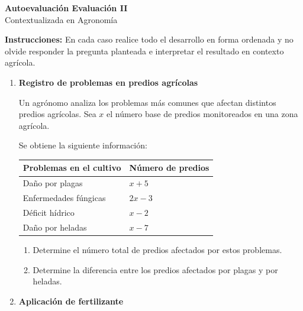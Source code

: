 \documentclass[12pt]{article}
\begin{document}
	
	\begin{center}
		{\LARGE \textbf{Autoevaluación Evaluación II}}\\[0.2cm]
		{\large Contextualizada en Agronomía}
	\end{center}
	
	\vspace{0.4cm}
	
	\textbf{Instrucciones:} En cada caso realice todo el desarrollo en forma ordenada y no olvide responder la pregunta planteada e interpretar el resultado en contexto agrícola.
	
	\vspace{0.5cm}
	
	\begin{enumerate}
		
		\item \textbf{Registro de problemas en predios agrícolas}
		
		Un agrónomo analiza los problemas más comunes que afectan distintos predios agrícolas.  
		Sea \(x\) el número base de predios monitoreados en una zona agrícola.
		
		Se obtiene la siguiente información:
		
		\begin{center}
			\begin{tabular}{|m{8cm}|>{\centering\arraybackslash}m{4cm}|}
				\hline
				\textbf{Problemas en el cultivo} & \textbf{Número de predios} \\
				\hline
				Daño por plagas & \(x + 5\) \\ \hline
				Enfermedades fúngicas & \(2x - 3\) \\ \hline
				Déficit hídrico & \(x - 2\) \\ \hline
				Daño por heladas & \(x - 7\) \\ \hline
			\end{tabular}
		\end{center}
		
		\begin{enumerate}[label=\alph*)]
			\item Determine el número total de predios afectados por estos problemas.
			\item Determine la diferencia entre los predios afectados por plagas y por heladas.
		\end{enumerate}
		
		\item \textbf{Aplicación de fertilizante}
		

\end{enumerate}
\end{document}
